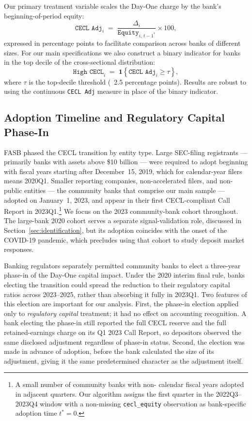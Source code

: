 Our primary treatment variable scales the Day-One charge by the bank's
beginning-of-period equity:
\begin{equation}
  \texttt{CECL Adj}_{i}
  \;=\;
  \frac{\Delta_i}{\texttt{Equity}_{i,\,t-1^{*}}}
  \times 100,
  \label{eq:treatment}
\end{equation}
expressed in percentage points to facilitate comparison across banks of
different sizes.  For our main specifications we also construct a binary
indicator for banks in the top decile of the cross-sectional distribution:
\begin{equation}
  \texttt{High CECL}_{i}
  \;=\;
  \mathbf{1}\!\left\{
    \texttt{CECL Adj}_{i} \geq \tau
  \right\},
  \label{eq:binary}
\end{equation}
where $\tau$ is the top-decile threshold (~2.5 percentage points).  Results are
robust to using the continuous \texttt{CECL Adj} measure in place of the
binary indicator.

\subsection{Adoption Timeline and Regulatory Capital Phase-In}
\label{sec:background:timeline}

FASB phased the CECL transition by entity type.  Large SEC-filing registrants
--- primarily banks with assets above \$10 billion --- were required to adopt
beginning with fiscal years starting after December~15, 2019, which for
calendar-year filers means 2020Q1.  Smaller reporting companies, non-accelerated
filers, and non-public entities --- the community banks that comprise our main
sample --- adopted on January~1, 2023, and appear in their first CECL-compliant
Call Report in 2023Q1.\footnote{A small number of community banks with non-
calendar fiscal years adopted in adjacent quarters.  Our algorithm assigns the
first quarter in the 2022Q3--2023Q4 window with a non-missing
\texttt{cecl\_equity} observation as bank-specific adoption time $t^{*} = 0$.}
We focus on the 2023 community-bank cohort throughout.  The large-bank 2020
cohort serves a separate signal-validation role, discussed in
Section~\ref{sec:identification}, but its adoption coincides with the onset of
the COVID-19 pandemic, which precludes using that cohort to study deposit
market responses.

Banking regulators separately permitted community banks to elect a three-year
phase-in of the Day-One capital impact.  Under the 2020 interim final rule,
banks electing the transition could spread the
reduction to their regulatory capital ratios across 2023--2025, rather than
absorbing it fully in 2023Q1.  Two features of this election are important for
our analysis.  First, the phase-in election applied only to \textit{regulatory
capital} treatment; it had no effect on accounting recognition.  A bank
electing the phase-in still reported the full CECL reserve and the full
retained-earnings charge on its Q1 2023 Call Report, so depositors observed the
same disclosed adjustment regardless of phase-in status.  Second, the election
was made in advance of adoption, before the bank calculated the size of its
adjustment, giving it the same predetermined character as the adjustment itself.

